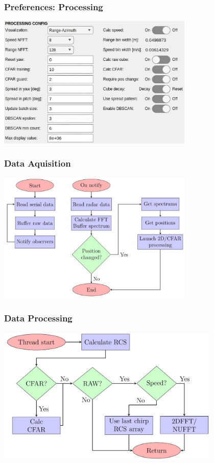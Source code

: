 \documentclass[aspectratio=169]{beamer}
\begin{document}
\begin{frame}[fragile]
  \frametitle{Preferences: Processing}
  \begin{center}
    \includegraphics[width=0.7\textwidth]{../img/preferences_crop2.png}
  \end{center}
\end{frame}

\begin{frame}[fragile]
  \frametitle{Data Aquisition}
  \begin{center}
    \includegraphics[width=0.7\textwidth]{../img/dataflow_1.jpg}
  \end{center}
\end{frame}

\begin{frame}[fragile]
  \frametitle{Data Processing}
  \begin{center}
    \includegraphics[width=0.8\textwidth]{../img/dataflow_2.jpg}
  \end{center}
\end{frame}
\end{document}
